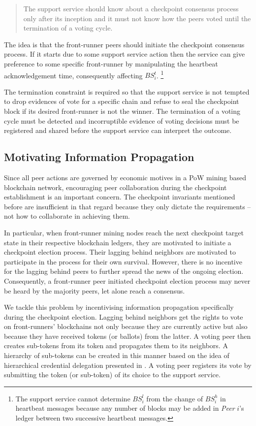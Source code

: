 \begin{quote}
The support service should know about a checkpoint consensus process only after its inception and it must not know how the peers voted until the termination of a voting cycle.         
\end{quote}

The idea is that the front-runner peers should initiate the checkpoint consensus process. If it starts due to some support service action then the service can give preference to some specific front-runner by manipulating the heartbeat acknowledgement time, consequently affecting $BS_i^t$. \footnote{The support service cannot determine $BS_i^l$ from the change of $BS_i^h$ in heartbeat messages because any number of blocks may be added in \textit{Peer} $i$'s ledger between two successive heartbeat messages.}

The termination constraint is required so that the support service is not tempted to drop evidences of vote for a specific chain and refuse to seal the checkpoint block if its desired front-runner is not the winner. The termination of a voting cycle must be detected and incorruptible evidence of voting decisions must be registered and shared before the support service can interpret the outcome.                          

\subsection{Motivating Information Propagation}
\label{info-propagate}
Since all peer actions are governed by economic motives in a PoW mining based blockchain network, encouraging peer collaboration during the checkpoint establishment is an important concern. The checkpoint invariants mentioned before are insufficient in that regard because they only dictate the requirements -- not how to collaborate in achieving them.

In particular, when front-runner mining nodes reach the next checkpoint target state in their respective blockchain ledgers, they are motivated to initiate a checkpoint election process. Their lagging behind neighbors are motivated to participate in the process for their own survival. However, there is no incentive for the lagging behind peers to further spread the news of the ongoing election. Consequently, a front-runner peer initiated checkpoint election process may never be heard by the majority peers, let alone reach a consensus.   

We tackle this problem by incentivising information propagation specifically during the checkpoint election. Lagging behind neighbors get the rights to vote on front-runners' blockchains not only because they are currently active but also because they have received tokens (or ballots) from the latter. A voting peer then creates sub-tokens from its token and propagates them to its neighbors. A hierarchy of sub-tokens can be created in this manner based on the idea of hierarchical credential delegation presented in \cite{Ding1996}. A voting peer registers its vote by submitting the token (or sub-token) of its choice to the support service.

